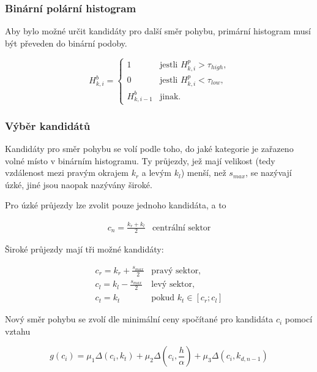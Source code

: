 \documentclass[twoside]{ctuthesis}
\theoremstyle{plain}
\theoremstyle{definition}
\theoremstyle{note}
\begin{document}
\subsubsection{Binární polární histogram}

Aby bylo možné určit kandidáty pro další směr pohybu, primární histogram musí být převeden do binární podoby.

$$H_{k,i}^{b} = \left\{
\begin{array}{ll}
1&\textrm{jestli $H_{k,i}^p > \tau_{high}$,}\\
0&\textrm{jestli $H_{k,i}^p < \tau_{low}$,}\\
H_{k, i-1}^b&\textrm{jinak.}
\end{array}
\right.
$$

\subsubsection{Výběr kandidátů}

Kandidáty pro směr pohybu se volí podle toho, do jaké kategorie je zařazeno volné místo v binárním histogramu. Ty průjezdy, jež mají velikost (tedy vzdálenost mezi pravým okrajem $k_r$ a levým $k_l$) menší, než $s_{max}$, se nazývají úzké, jiné jsou naopak nazývány široké.

Pro úzké průjezdy lze zvolit pouze jednoho kandidáta, a to 

$$\begin{array}{ll}
c_n = \frac{k_r + k_l}{2}&\textrm{centrální sektor}
\end{array}$$

Široké průjezdy mají tři možné kandidáty:

$$\begin{array}{ll}
c_r = k_r + \frac{s_{max}}{2}&\textrm{pravý sektor,}\\

c_l = k_l - \frac{s_{max}}{2}&\textrm{levý sektor,}\\

c_t = k_t&\textrm{pokud $k_t \in \left[c_r;c_l\right]$}
\end{array}$$

Nový směr pohybu se zvolí dle minimální ceny spočítané pro kandidáta $c_i$ pomocí vztahu

\begin{equation}
g(c_i) = \mu_1 \Delta\left(c_i, k_t\right) + \mu_2\Delta\left(c_i, \frac{h}{\alpha}\right) + \mu_3\Delta\left(c_i, k_{d, n-1}\right)
\end{equation}
\end{document}
